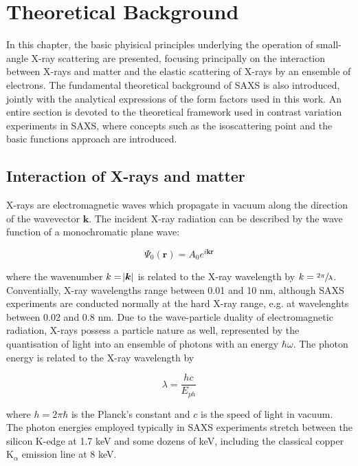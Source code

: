 
\newcommand{\vect}[1]{\bm{#1}}


\chapter{Theoretical Background}
\label{chap:theory_SAXS}
In this chapter, the basic phyisical principles underlying the operation of small-angle X-ray scattering are presented, focusing principally on the interaction between X-rays and matter and the elastic scattering of X-rays by an ensemble of electrons. The fundamental theoretical background of SAXS is also introduced, jointly with the analytical expressions of the form factors used in this work. An entire section is devoted to the theoretical framework used in contrast variation experiments in SAXS, where concepts such as the isoscattering point and the basic functions approach are introduced.

\section{Interaction of X-rays and matter}

X-rays are electromagnetic waves which propagate in vacuum along the direction of the wavevector $\vect{k}$. The incident X-ray radiation can be described by the wave function of a monochromatic plane wave:

\begin{equation}
        \label{eq:IncidentWave}
        \Psi_0\left( \vect{r} \right)=A_0 e^{i \vect{k}\vect{r} }
\end{equation}

where the wavenumber $k=\abs{\vect{k}}$ is related to the X-ray wavelength by $k=\sfrac{2\pi}{\lambda}$. Conventially, X-ray wavelengths range between 0.01 and 10 nm, although SAXS experiments are conducted normally at the hard X-ray range, e.g. at wavelenghts between 0.02 and 0.8 nm. Due to the wave-particle duality of electromagnetic radiation, X-rays possess a particle nature as well, represented by the quantisation of light into an ensemble of photons with an energy $\hbar \omega$. The photon energy is related to the X-ray wavelength by \citep{als-nielsen_elements_2011}

\begin{equation}
        \lambda = \frac{h c}{E_{ph}}
\end{equation}

where $h=2\pi\hbar$ is the Planck's constant and $c$ is the speed of light in vacuum. The photon energies employed typically in SAXS experiments stretch between the silicon K-edge at 1.7 keV and some dozens of keV, including the classical copper K$_{\alpha}$ emission line at 8 keV.

